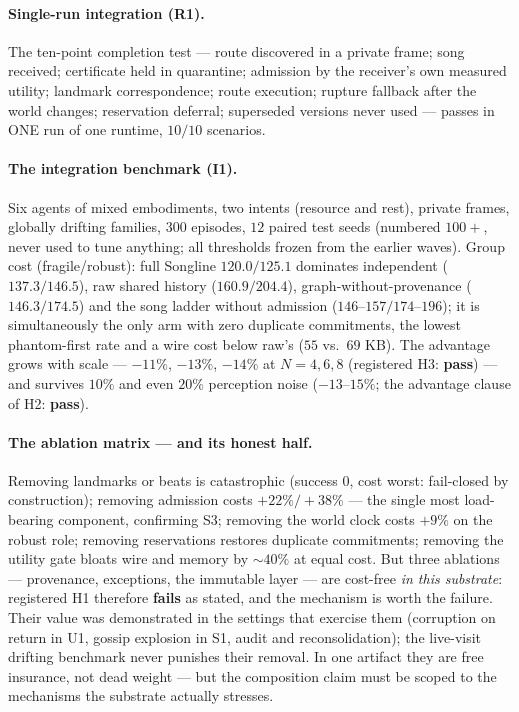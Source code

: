 \documentclass{article}
\begin{document}
\paragraph{Single-run integration (R1).} The ten-point completion
test --- route discovered in a private frame; song received;
certificate held in quarantine; admission by the receiver's own
measured utility; landmark correspondence; route execution; rupture
fallback after the world changes; reservation deferral; superseded
versions never used --- passes in ONE run of one runtime, $10/10$
scenarios.

\paragraph{The integration benchmark (I1).} Six agents of mixed
embodiments, two intents (resource and rest), private frames,
globally drifting families, $300$ episodes, $12$ paired test seeds
(numbered $100{+}$, never used to tune anything; all thresholds
frozen from the earlier waves). Group cost (fragile/robust): full
Songline $\mathbf{120.0/125.1}$ dominates independent ($137.3/146.5$),
raw shared history ($160.9/204.4$), graph-without-provenance
($146.3/174.5$) and the song ladder without admission
($146$--$157/174$--$196$); it is simultaneously the only arm with
zero duplicate commitments, the lowest phantom-first rate and a wire
cost below raw's ($55$ vs.\ $69$ KB). The advantage grows with scale
--- $-11\%$, $-13\%$, $-14\%$ at $N = 4, 6, 8$ (registered H3:
\textbf{pass}) --- and survives $10\%$ and even $20\%$ perception
noise ($-13$--$15\%$; the advantage clause of H2: \textbf{pass}).

\paragraph{The ablation matrix --- and its honest half.} Removing
landmarks or beats is catastrophic (success $0$, cost worst:
fail-closed by construction); removing admission costs $+22\%/+38\%$
--- the single most load-bearing component, confirming S3; removing
the world clock costs $+9\%$ on the robust role; removing
reservations restores duplicate commitments; removing the utility
gate bloats wire and memory by ${\sim}40\%$ at equal cost. But three
ablations --- provenance, exceptions, the immutable layer --- are
cost-free \emph{in this substrate}: registered H1 therefore
\textbf{fails} as stated, and the mechanism is worth the failure.
Their value was demonstrated in the settings that exercise them
(corruption on return in U1, gossip explosion in S1, audit and
reconsolidation); the live-visit drifting benchmark never punishes
their removal. In one artifact they are free insurance, not dead
weight --- but the composition claim must be scoped to the mechanisms
the substrate actually stresses.
\end{document}
